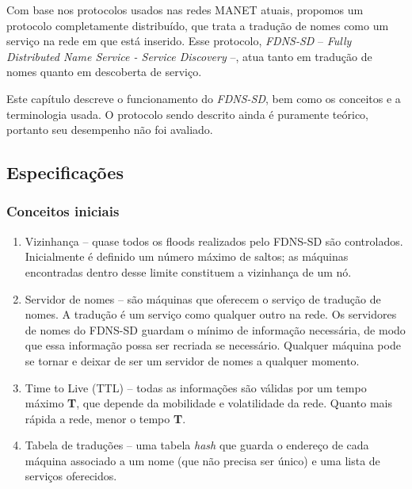 
Com base nos protocolos usados nas redes MANET atuais, propomos um protocolo
completamente distribuído, que trata a tradução de nomes como um serviço na rede
em que está inserido. Esse protocolo, \textit{FDNS-SD} -- 
\textit{Fully Distributed Name Service - Service Discovery} --, atua tanto em
tradução de nomes quanto em descoberta de serviço.

Este capítulo descreve o funcionamento do \textit{FDNS-SD}, bem como os conceitos
e a terminologia usada. O protocolo sendo descrito ainda é puramente teórico,
portanto seu desempenho não foi avaliado.

\subsection{Especificações}
    \subsubsection{Conceitos iniciais}
        \begin{enumerate}
            \item Vizinhança -- quase todos os floods realizados pelo FDNS-SD são
            controlados. Inicialmente é definido um número máximo de saltos; as
            máquinas  encontradas dentro desse limite constituem a vi\-zi\-nhan\-ça
            de um nó.
            \item Servidor de nomes -- são máquinas que oferecem o serviço de
            tradução de nomes. A tradução é um serviço como qualquer outro na rede.
            Os servidores de nomes do FDNS-SD guardam o mínimo de informação
            necessária, de modo que essa informação possa ser recriada se necessário.
            Qualquer máquina pode se tornar e deixar de ser um servidor de nomes
            a qualquer momento.
            \item Time to Live (TTL) -- todas as informações são válidas por um 
            tempo máximo \textbf{T}, que depende da mobilidade e volatilidade da
            rede. Quanto mais rápida a rede, menor o tempo \textbf{T}.
            \item Tabela de traduções -- uma tabela \textit{hash} que guarda o
            endereço de cada máquina associado a um nome (que não precisa ser único)
            e uma lista de serviços oferecidos.
        \end{enumerate}
        
